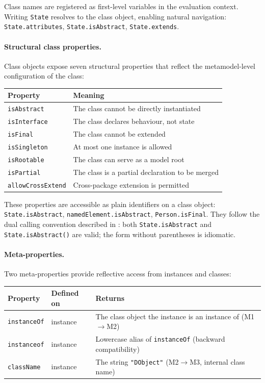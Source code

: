 \documentclass[11pt,a4paper]{article}
\begin{document}
Class names are registered as first-level variables in the evaluation context. Writing \texttt{State} resolves to the class object, enabling natural navigation: \texttt{State.attributes}, \texttt{State.isAbstract}, \texttt{State.extends}.

\paragraph{Structural class properties.} Class objects expose seven structural properties that reflect the metamodel-level configuration of the class:

\begin{center}
\begin{tabular}{@{}ll@{}}
\toprule
\textbf{Property} & \textbf{Meaning} \\
\midrule
\texttt{isAbstract} & The class cannot be directly instantiated \\
\texttt{isInterface} & The class declares behaviour, not state \\
\texttt{isFinal} & The class cannot be extended \\
\texttt{isSingleton} & At most one instance is allowed \\
\texttt{isRootable} & The class can serve as a model root \\
\texttt{isPartial} & The class is a partial declaration to be merged \\
\texttt{allowCrossExtend} & Cross-package extension is permitted \\
\bottomrule
\end{tabular}
\end{center}

These properties are accessible as plain identifiers on a class object: \texttt{State.isAbstract}, \texttt{namedElement.isAbstract}, \texttt{Person.isFinal}. They follow the dual calling convention described in : both \texttt{State.isAbstract} and \texttt{State.isAbstract()} are valid; the form without parentheses is idiomatic.

\paragraph{Meta-properties.} Two meta-properties provide reflective access from instances and classes:

\begin{center}
\begin{tabular}{@{}lll@{}}
\toprule
\textbf{Property} & \textbf{Defined on} & \textbf{Returns} \\
\midrule
\texttt{instanceOf} & instance & The class object the instance is an instance of (M1$\to$M2) \\
\texttt{instanceof} & instance & Lowercase alias of \texttt{instanceOf} (backward compatibility) \\
\texttt{className} & instance & The string \texttt{"DObject"} (M2$\to$M3, internal class name) \\
\bottomrule
\end{tabular}
\end{center}
\end{document}
